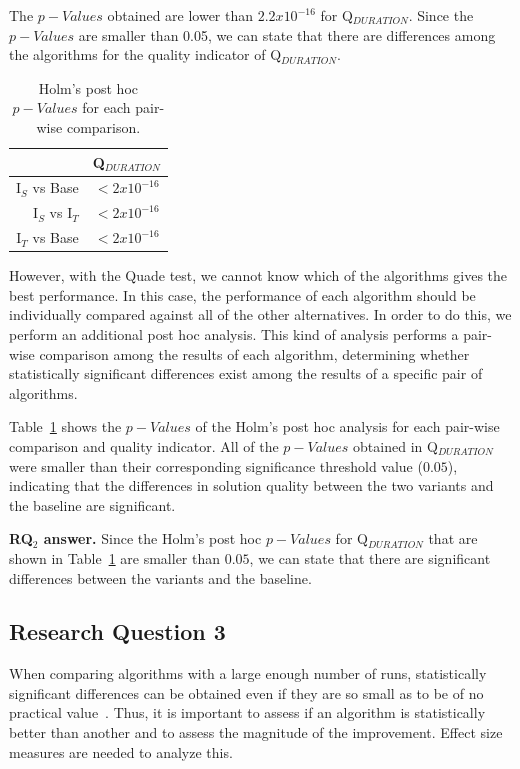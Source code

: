 The $p-Values$ obtained are lower than $2.2x10^{-16}$ for Q$_{DURATION}$. Since the $p-Values$ are smaller than 0.05, we can state that there are differences among the algorithms for the quality indicator of Q$_{DURATION}$.

\begin{table}[H]
\centering
\caption{Holm's post hoc $p-Values$ for each pair-wise comparison.}
\label{tab:postHoc}
\begin{tabular}{@{}rc@{}}
\toprule
               & Q$_{DURATION}$ \\ \midrule
I$_S$ vs Base  & $<2x10^{-16}$  \\
I$_S$ vs I$_T$ & $<2x10^{-16}$  \\
I$_T$ vs Base  & $<2x10^{-16}$  \\ \bottomrule
\end{tabular}
\end{table}

However, with the Quade test, we cannot know which of the algorithms gives the best performance. In this case, the performance of each algorithm should be individually compared against all of the other alternatives. In order to do this, we perform an additional post hoc analysis. This kind of analysis performs a pair-wise comparison among the results of each algorithm, determining whether statistically significant differences exist among the results of a specific pair of algorithms.

Table~\ref{tab:postHoc} shows the $p-Values$ of the Holm's post hoc analysis for each pair-wise comparison and quality indicator. All of the $p-Values$ obtained in Q$_{DURATION}$ were smaller than their corresponding significance threshold value ($0.05$), indicating that the differences in solution quality between the two variants and the baseline are significant.

\textbf{RQ$_2$ answer. }
Since the Holm's post hoc $p-Values$ for Q$_{DURATION}$ that are shown in Table~\ref{tab:postHoc} are smaller than $0.05$, we can state that there are significant differences between the variants and the baseline.

\subsection{Research Question 3}

When comparing algorithms with a large enough number of runs, statistically significant differences can be obtained even if they are so small as to be of no practical value~\cite{Arcuri2014}. Thus, it is important to assess if an algorithm is statistically better than another and to assess the magnitude of the improvement. Effect size measures are needed to analyze this.

